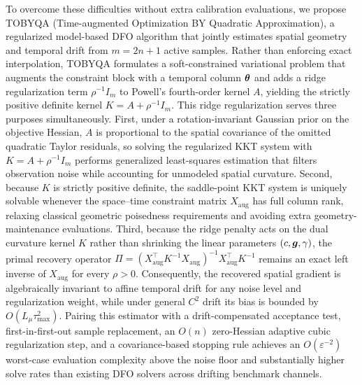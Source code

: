 To overcome these difficulties without extra calibration evaluations, we propose TOBYQA (Time-augmented Optimization BY Quadratic Approximation), a regularized model-based DFO algorithm that jointly estimates spatial geometry and temporal drift from $m = 2n+1$ active samples. Rather than enforcing exact interpolation, TOBYQA formulates a soft-constrained variational problem that augments the constraint block with a temporal column $\boldsymbol{\theta}$ and adds a ridge regularization term $\rho^{-1} I_m$ to Powell's fourth-order kernel $A$, yielding the strictly positive definite kernel $K = A + \rho^{-1} I_m$. This ridge regularization serves three purposes simultaneously. First, under a rotation-invariant Gaussian prior on the objective Hessian, $A$ is proportional to the spatial covariance of the omitted quadratic Taylor residuals, so solving the regularized KKT system with $K = A + \rho^{-1} I_m$ performs generalized least-squares estimation that filters observation noise while accounting for unmodeled spatial curvature. Second, because $K$ is strictly positive definite, the saddle-point KKT system is uniquely solvable whenever the space--time constraint matrix $X_{\mathrm{aug}}$ has full column rank, relaxing classical geometric poisedness requirements and avoiding extra geometry-maintenance evaluations. Third, because the ridge penalty acts on the dual curvature kernel $K$ rather than shrinking the linear parameters $(c, \boldsymbol{g}, \gamma)$, the primal recovery operator $\Pi = (X_{\mathrm{aug}}^\top K^{-1} X_{\mathrm{aug}})^{-1} X_{\mathrm{aug}}^\top K^{-1}$ remains an exact left inverse of $X_{\mathrm{aug}}$ for every $\rho > 0$. Consequently, the recovered spatial gradient is algebraically invariant to affine temporal drift for any noise level and regularization weight, while under general $C^2$ drift its bias is bounded by $O(L_\mu \tau_{\max}^2)$. Pairing this estimator with a drift-compensated acceptance test, first-in-first-out sample replacement, an $O(n)$ zero-Hessian adaptive cubic regularization step, and a covariance-based stopping rule achieves an $O(\varepsilon^{-2})$ worst-case evaluation complexity above the noise floor and substantially higher solve rates than existing DFO solvers across drifting benchmark channels.
